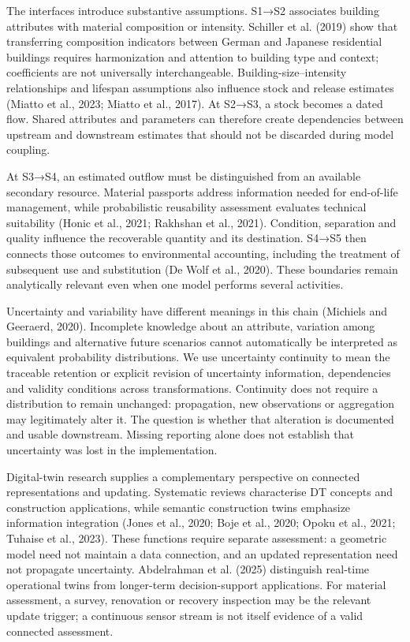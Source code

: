 The interfaces introduce substantive assumptions. S1→S2 associates building attributes with material composition or intensity. Schiller et al. (2019) show that transferring composition indicators between German and Japanese residential buildings requires harmonization and attention to building type and context; coefficients are not universally interchangeable. Building-size–intensity relationships and lifespan assumptions also influence stock and release estimates (Miatto et al., 2023; Miatto et al., 2017). At S2→S3, a stock becomes a dated flow. Shared attributes and parameters can therefore create dependencies between upstream and downstream estimates that should not be discarded during model coupling.

At S3→S4, an estimated outflow must be distinguished from an available secondary resource. Material passports address information needed for end-of-life management, while probabilistic reusability assessment evaluates technical suitability (Honic et al., 2021; Rakhshan et al., 2021). Condition, separation and quality influence the recoverable quantity and its destination. S4→S5 then connects those outcomes to environmental accounting, including the treatment of subsequent use and substitution (De Wolf et al., 2020). These boundaries remain analytically relevant even when one model performs several activities.

Uncertainty and variability have different meanings in this chain (Michiels and Geeraerd, 2020). Incomplete knowledge about an attribute, variation among buildings and alternative future scenarios cannot automatically be interpreted as equivalent probability distributions. We use uncertainty continuity to mean the traceable retention or explicit revision of uncertainty information, dependencies and validity conditions across transformations. Continuity does not require a distribution to remain unchanged: propagation, new observations or aggregation may legitimately alter it. The question is whether that alteration is documented and usable downstream. Missing reporting alone does not establish that uncertainty was lost in the implementation.

Digital-twin research supplies a complementary perspective on connected representations and updating. Systematic reviews characterise DT concepts and construction applications, while semantic construction twins emphasize information integration (Jones et al., 2020; Boje et al., 2020; Opoku et al., 2021; Tuhaise et al., 2023). These functions require separate assessment: a geometric model need not maintain a data connection, and an updated representation need not propagate uncertainty. Abdelrahman et al. (2025) distinguish real-time operational twins from longer-term decision-support applications. For material assessment, a survey, renovation or recovery inspection may be the relevant update trigger; a continuous sensor stream is not itself evidence of a valid connected assessment.

